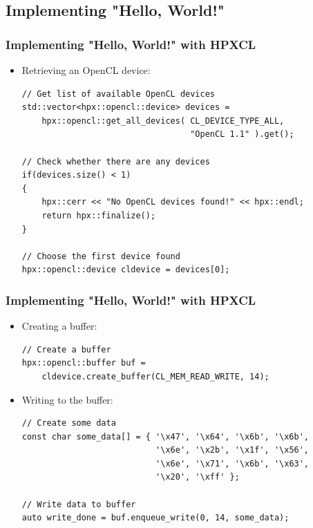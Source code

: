 \documentclass{beamer}
\begin{document}
\subsection{Implementing "Hello, World!"}
\begin{frame}[fragile]
    \frametitle{Implementing "Hello, World!" with HPXCL}
    \begin{itemize}
        \item Retrieving an OpenCL device:
        \begin{lstlisting}[firstnumber=30]
// Get list of available OpenCL devices
std::vector<hpx::opencl::device> devices =
    hpx::opencl::get_all_devices( CL_DEVICE_TYPE_ALL,
                                  "OpenCL 1.1" ).get();

// Check whether there are any devices
if(devices.size() < 1)
{
    hpx::cerr << "No OpenCL devices found!" << hpx::endl;
    return hpx::finalize();
}

// Choose the first device found
hpx::opencl::device cldevice = devices[0];
        \end{lstlisting}
    \end{itemize}
\end{frame}

\begin{frame}[fragile]
    \frametitle{Implementing "Hello, World!" with HPXCL}
    \begin{itemize}
        \item Creating a buffer:
        \begin{lstlisting}[firstnumber=40]
// Create a buffer
hpx::opencl::buffer buf =
    cldevice.create_buffer(CL_MEM_READ_WRITE, 14);
        \end{lstlisting}
        \item Writing to the buffer:
        \begin{lstlisting}[firstnumber=44]
// Create some data
const char some_data[] = { '\x47', '\x64', '\x6b', '\x6b',
                           '\x6e', '\x2b', '\x1f', '\x56',
                           '\x6e', '\x71', '\x6b', '\x63',
                           '\x20', '\xff' };

// Write data to buffer
auto write_done = buf.enqueue_write(0, 14, some_data);
        \end{lstlisting}
    \end{itemize}
\end{frame}
\end{document}
